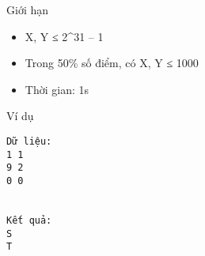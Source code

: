 Giới hạn  
\begin{itemize}
	\item     X, Y ≤ 2^31 – 1   
	\item     Trong 50\% số điểm, có X, Y ≤ 1000   
	\item     Thời gian: 1s   
\end{itemize}
   Ví dụ  
\begin{verbatim}
Dữ liệu:
1 1
9 2
0 0


Kết quả:
S
T

\end{verbatim}